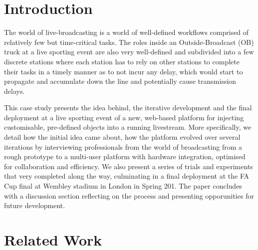 \documentclass[sigchi-a, authorversion]{acmart}
\begin{document}


\begin{abstract}
    \ldots
\end{abstract}





\maketitle

\section{Introduction}

 The world of live-broadcasting is a world of well-defined workflows comprised
 of relatively few but time-critical tasks. The roles inside an
 Outside-Broadcast (OB) truck at a live sporting event are also very
 well-defined and subdivided into a few discrete stations where each station
 has to rely on other stations to complete their tasks in a timely manner as to
 not incur any delay, which would start to propagate and accumulate down the
 line and potentially cause transmission delays.

 This case study presents the idea behind, the iterative development and the
 final deployment at a live sporting event of a new, web-based platform for
 injecting customisable, pre-defined objects into a running livestream. More
 specifically, we detail how the initial idea came about, how the platform
 evolved over several iterations by interviewing professionals from the world
 of broadcasting from a rough prototype to a multi-user platform with hardware
 integration, optimised for collaboration and efficiency. We also present a
 series of trials and experiments that very completed along the way,
 culminating in a final deployment at the FA Cup final at Wembley stadium in
 London in Spring 201. The paper concludes with a discussion section reflecting
 on the process and presenting opporunities for future development.

\section{Related Work}
\end{document}
